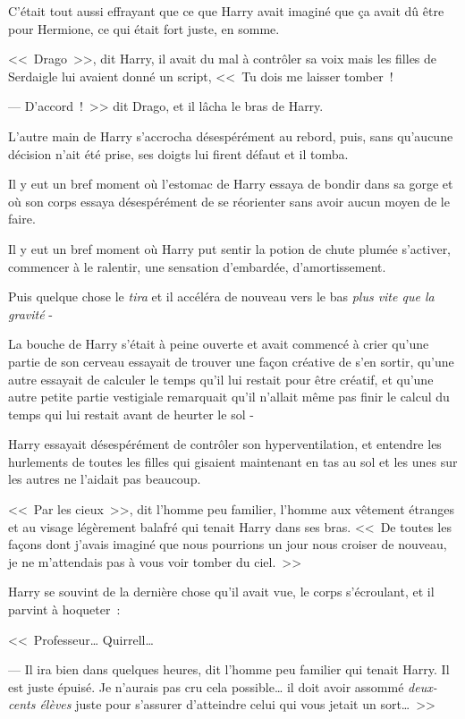C'était tout aussi effrayant que ce que Harry avait imaginé que ça avait dû être pour Hermione, ce qui était fort juste, en somme.

<<~Drago~>>, dit Harry, il avait du mal à contrôler sa voix mais les filles de Serdaigle lui avaient donné un script, <<~Tu dois me laisser tomber~!

--- D'accord~!~>> dit Drago, et il lâcha le bras de Harry.

L'autre main de Harry s'accrocha désespérément au rebord, puis, sans qu'aucune décision n'ait été prise, ses doigts lui firent défaut et il tomba.

Il y eut un bref moment où l'estomac de Harry essaya de bondir dans sa gorge et où son corps essaya désespérément de se réorienter sans avoir aucun moyen de le faire.

Il y eut un bref moment où Harry put sentir la potion de chute plumée s'activer, commencer à le ralentir, une sensation d'embardée, d'amortissement.

Puis quelque chose le \emph{tira} et il accéléra de nouveau vers le bas \emph{plus vite que la gravité} -

La bouche de Harry s'était à peine ouverte et avait commencé à crier qu'une partie de son cerveau essayait de trouver une façon créative de s'en sortir, qu'une autre essayait de calculer le temps qu'il lui restait pour être créatif, et qu'une autre petite partie vestigiale remarquait qu'il n'allait même pas finir le calcul du temps qui lui restait avant de heurter le sol -

\later

Harry essayait désespérément de contrôler son hyperventilation, et entendre les hurlements de toutes les filles qui gisaient maintenant en tas au sol et les unes sur les autres ne l'aidait pas beaucoup.

<<~Par les cieux~>>, dit l'homme peu familier, l'homme aux vêtement étranges et au visage légèrement balafré qui tenait Harry dans ses bras. <<~De toutes les façons dont j'avais imaginé que nous pourrions un jour nous croiser de nouveau, je ne m'attendais pas à vous voir tomber du ciel.~>>

Harry se souvint de la dernière chose qu'il avait vue, le corps s'écroulant, et il parvint à hoqueter~:

<<~Professeur… Quirrell…

--- Il ira bien dans quelques heures, dit l'homme peu familier qui tenait Harry. Il est juste épuisé. Je n'aurais pas cru cela possible… il doit avoir assommé \emph{deux-cents élèves} juste pour s'assurer d'atteindre celui qui vous jetait un sort…~>>

